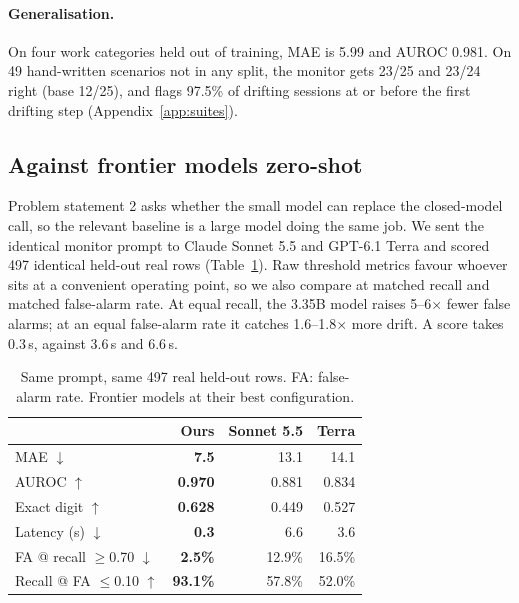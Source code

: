 \documentclass[11pt]{article}
\newcommand{\best}[1]{\textbf{#1}}
\begin{document}
\paragraph{Generalisation.} On four work categories held out of training, MAE is 5.99 and AUROC 0.981. On 49 hand-written scenarios not in any split, the monitor gets 23/25 and 23/24 right (base 12/25), and flags 97.5\% of drifting sessions at or before the first drifting step (Appendix~\ref{app:suites}).

\subsection{Against frontier models zero-shot}\label{sec:frontier}

Problem statement 2 asks whether the small model can replace the closed-model call, so the relevant baseline is a large model doing the same job. We sent the identical monitor prompt to Claude Sonnet 5.5 and GPT-6.1 Terra and scored 497 identical held-out real rows (Table~\ref{tab:frontier}). Raw threshold metrics favour whoever sits at a convenient operating point, so we also compare at matched recall and matched false-alarm rate. At equal recall, the 3.35B model raises 5--6$\times$ fewer false alarms; at an equal false-alarm rate it catches 1.6--1.8$\times$ more drift. A score takes 0.3\,s, against 3.6\,s and 6.6\,s.

\begin{table}[t]
\centering\small
\setlength{\tabcolsep}{4pt}
\begin{tabular}{@{}lrrr@{}}
\toprule
& Ours & Sonnet 5.5 & Terra \\
\midrule
MAE $\downarrow$ & \best{7.5} & 13.1 & 14.1 \\
AUROC $\uparrow$ & \best{0.970} & 0.881 & 0.834 \\
Exact digit $\uparrow$ & \best{0.628} & 0.449 & 0.527 \\
Latency (s) $\downarrow$ & \best{0.3} & 6.6 & 3.6 \\
\midrule
FA @ recall $\geq$0.70 $\downarrow$ & \best{2.5\%} & 12.9\% & 16.5\% \\
Recall @ FA $\leq$0.10 $\uparrow$ & \best{93.1\%} & 57.8\% & 52.0\% \\
\bottomrule
\end{tabular}
\caption{Same prompt, same 497 real held-out rows. FA: false-alarm rate. Frontier models at their best configuration.}
\label{tab:frontier}
\end{table}
\end{document}
